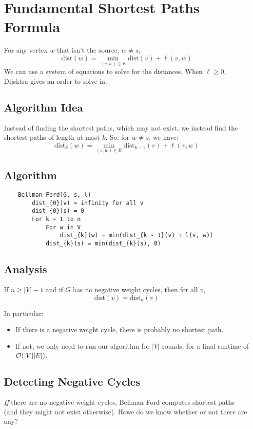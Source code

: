 \documentclass[letterpaper]{article}
\begin{document}
\section{Fundamental Shortest Paths Formula}
For any vertex $w$ that isn't the source, $w \neq s$,
\[\text{dist}(w) = \min_{(v, w) \in E} \text{dist}(v) + \ell(v, w)\]
We can use a system of equations to solve for the distances. When $\ell \geq 0$, Dijsktra gives an order to solve in.

\subsection{Algorithm Idea}
Instead of finding the shortest paths, which may not exist, we instead find the shortest paths of length at most $k$. So, for $w \neq s$, we have: 
\[\text{dist}_{k}(w) = \min_{(v, w) \in E} \text{dist}_{k - 1}(v) + \ell(v, w)\]

\subsection{Algorithm}
\begin{verbatim}
    Bellman-Ford(G, s, l)
        dist_{0}(v) = infinity for all v 
        dist_{0}(s) = 0
        For k = 1 to n
            For w in V
                dist_{k}(w) = min(dist_{k - 1}(v) + l(v, w))
            dist_{k}(s) = min(dist_{k}(s), 0)
\end{verbatim}

\subsection{Analysis}
\begin{proposition}
    If $n \geq |V| - 1$ and if $G$ has no negative weight cycles, then for all $v$,
    \[\text{dist}(v) = \text{dist}_{n}(v)\]
\end{proposition}
In particular:
\begin{itemize}
    \item If there is a negative weight cycle, there is probably no shortest path. 
    \item If not, we only need to run our algorithm for $|V|$ rounds, for a final runtime of $\mathcal{O}(|V||E|)$. 
\end{itemize}

\subsection{Detecting Negative Cycles}
\emph{If} there are no negative weight cycles, Bellman-Ford computes shortest paths (and they might not exist otherwise). Howe do we know whether or not there are any? 
\end{document}
